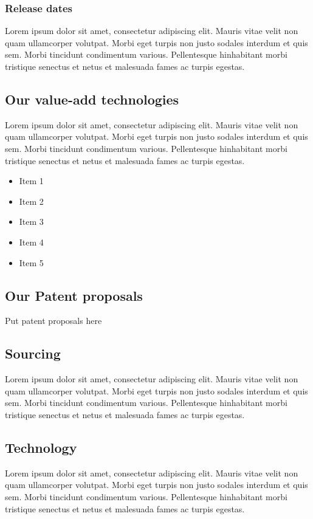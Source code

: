 \documentclass[11pt]{article}
\begin{document}
\subsubsection{Release dates}
Lorem ipsum dolor sit amet, consectetur adipiscing elit. Mauris vitae velit
non quam ullamcorper volutpat. Morbi eget turpis non justo sodales interdum
et quis sem. Morbi tincidunt condimentum various. Pellentesque hinhabitant morbi
tristique senectus et netus et malesuada fames ac turpis egestas.\newline

\subsection{Our value-add technologies}
Lorem ipsum dolor sit amet, consectetur adipiscing elit. Mauris vitae velit
non quam ullamcorper volutpat. Morbi eget turpis non justo sodales interdum
et quis sem. Morbi tincidunt condimentum various. Pellentesque hinhabitant morbi
tristique senectus et netus et malesuada fames ac turpis egestas.\newline
\begin{itemize}
\item Item 1
\item Item 2
\item Item 3
\item Item 4
\item Item 5
\end{itemize}

\subsection{Our Patent proposals}
Put patent proposals here\newline

\subsection{Sourcing}
Lorem ipsum dolor sit amet, consectetur adipiscing elit. Mauris vitae velit
non quam ullamcorper volutpat. Morbi eget turpis non justo sodales interdum
et quis sem. Morbi tincidunt condimentum various. Pellentesque hinhabitant morbi
tristique senectus et netus et malesuada fames ac turpis egestas.\newline
\subsection{Technology}
Lorem ipsum dolor sit amet, consectetur adipiscing elit. Mauris vitae velit
non quam ullamcorper volutpat. Morbi eget turpis non justo sodales interdum
et quis sem. Morbi tincidunt condimentum various. Pellentesque hinhabitant morbi
tristique senectus et netus et malesuada fames ac turpis egestas.\newline
\end{document}
